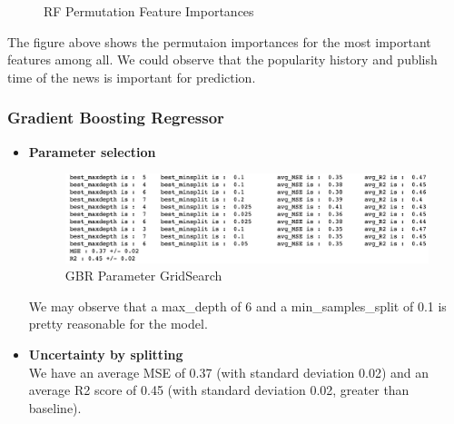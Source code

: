 \documentclass{article}
\begin{document}
\begin{itemize}
\begin{figure}[H]
\caption{RF Permutation Feature Importances}
\end{figure}
The figure above shows the permutaion importances for the most important features among all. We could observe that the popularity history and publish time of the news is important for prediction.
\end{itemize}



\subsubsection{Gradient Boosting Regressor}

\begin{itemize}
\item \textbf{Parameter selection}

\begin{figure}[H]
\centering
\includegraphics[scale=0.4]{"gbr_param"}
\caption{GBR Parameter GridSearch}
\end{figure}

We may observe that a max\_depth of 6 and a min\_samples\_split of 0.1 is pretty reasonable for the model. 
\item \textbf{Uncertainty by splitting}\\
We have an average MSE of 0.37 (with standard deviation 0.02) and an average R2 score of 0.45 (with standard deviation 0.02, greater than baseline). 


\end{itemize}
\end{document}
